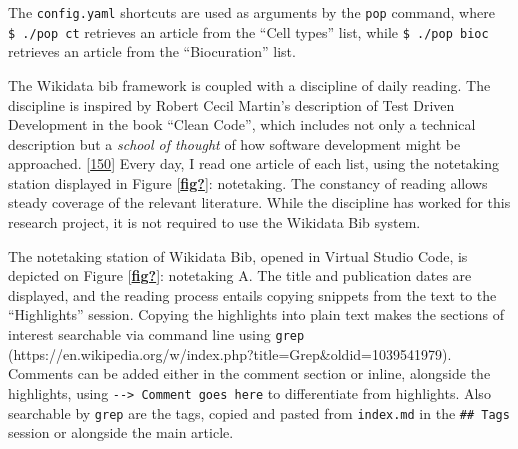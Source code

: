 The \texttt{config.yaml} shortcuts are used as arguments by the \texttt{pop} command, where \texttt{\$\ ./pop\ ct} retrieves an article from the ``Cell types'' list, while \texttt{\$\ ./pop\ bioc} retrieves an article from the ``Biocuration'' list.

The Wikidata bib framework is coupled with a discipline of daily reading.
The discipline is inspired by Robert Cecil Martin's description of Test Driven Development in the book ``Clean Code'', which includes not only a technical description but a \emph{school of thought} of how software development might be approached. {[}\protect\hyperlink{ref-13HqB23xH}{150}{]}
Every day, I read one article of each list, using the notetaking station displayed in Figure {[}\protect\hyperlink{ref-fig}{\textbf{fig?}}{]}: notetaking.
The constancy of reading allows steady coverage of the relevant literature.
While the discipline has worked for this research project, it is not required to use the Wikidata Bib system.

The notetaking station of Wikidata Bib, opened in Virtual Studio Code, is depicted on Figure {[}\protect\hyperlink{ref-fig}{\textbf{fig?}}{]}: notetaking A.
The title and publication dates are displayed, and the reading process entails copying snippets from the text to the ``Highlights'' session.
Copying the highlights into plain text makes the sections of interest searchable via command line using \texttt{grep} (https://en.wikipedia.org/w/index.php?title=Grep\&oldid=1039541979).
Comments can be added either in the comment section or inline, alongside the highlights, using \texttt{-\/-\textgreater{}\ Comment\ goes\ here} to differentiate from highlights.
Also searchable by \texttt{grep} are the tags, copied and pasted from \texttt{index.md} in the \texttt{\#\#\ Tags} session or alongside the main article.

